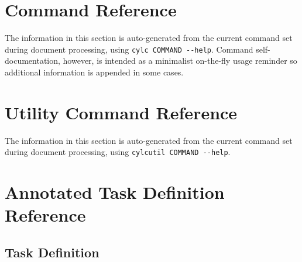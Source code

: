 \documentclass[11pt,a4paper]{article}
\begin{document}
\lstset{language=}


%

\pagebreak
\section{Command Reference}
\label{CommandReference}

The information in this section is auto-generated from
the current command set during document processing, using  
\lstinline=cylc COMMAND --help=. 
Command self-documentation, however, is intended as a minimalist
on-the-fly usage reminder so additional information is appended in
some cases.
  
\lstset{language=usage}

\pagebreak

\section{Utility Command Reference}
\label{UtilityCommandReference}

The information in this section is auto-generated from
the current command set during document processing, using  
\lstinline=cylcutil COMMAND --help=. 
\lstset{language=usage}

\pagebreak


\section{Annotated Task Definition Reference}

\subsection{Task Definition}
\label{AnnotatedTaskDefinitionReferenceFile}
\lstset{language=cylctaskdef}

\lstset{language=}
\end{document}
